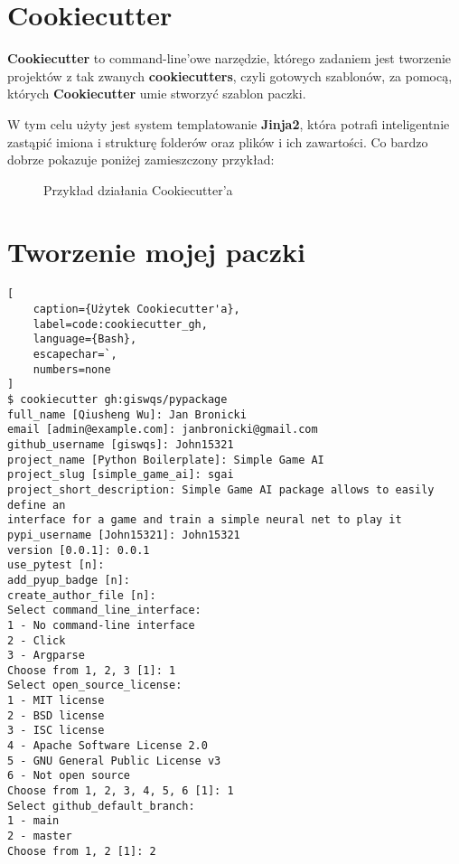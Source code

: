 \section{Cookiecutter}
\textbf{Cookiecutter} to command-line'owe narzędzie, którego zadaniem jest tworzenie projektów z tak zwanych \textbf{cookiecutters}, czyli gotowych szablonów, za pomocą, których \textbf{Cookiecutter} umie stworzyć szablon paczki.

W tym celu użyty jest system templatowanie \textbf{Jinja2}, która potrafi inteligentnie zastąpić imiona i strukturę folderów oraz plików i ich zawartości. Co bardzo dobrze pokazuje poniżej zamieszczony przykład:

\begin{figure}[h]
    \centering
    \caption{Przykład działania Cookiecutter'a \cite{CookiecutterExample}}
    \label{img:cookiecutter_example}
\end{figure}


\clearpage
\section{Tworzenie mojej paczki}


\begin{onepage}
    \begin{lstlisting}[
    caption={Użytek Cookiecutter'a},
    label=code:cookiecutter_gh,
    language={Bash},
    escapechar=`,
    numbers=none
]
$ cookiecutter gh:giswqs/pypackage
full_name [Qiusheng Wu]: Jan Bronicki
email [admin@example.com]: janbronicki@gmail.com
github_username [giswqs]: John15321
project_name [Python Boilerplate]: Simple Game AI
project_slug [simple_game_ai]: sgai
project_short_description: Simple Game AI package allows to easily define an
interface for a game and train a simple neural net to play it
pypi_username [John15321]: John15321
version [0.0.1]: 0.0.1
use_pytest [n]:
add_pyup_badge [n]:
create_author_file [n]:
Select command_line_interface:
1 - No command-line interface
2 - Click
3 - Argparse
Choose from 1, 2, 3 [1]: 1
Select open_source_license:
1 - MIT license
2 - BSD license
3 - ISC license
4 - Apache Software License 2.0
5 - GNU General Public License v3
6 - Not open source
Choose from 1, 2, 3, 4, 5, 6 [1]: 1
Select github_default_branch:
1 - main
2 - master
Choose from 1, 2 [1]: 2
\end{lstlisting}
\end{onepage}





